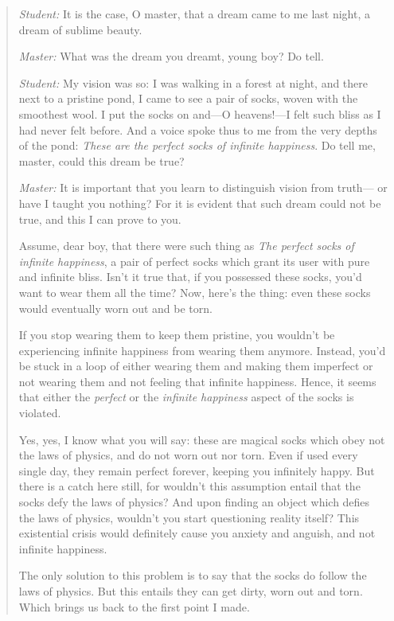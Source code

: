 \documentclass[a4paper, 12pt]{article}
\begin{document}
\begin{quote}

\textit{Student:} It is the case, O master, that a dream came to me last night,
a dream of sublime beauty. 

\textit{Master:} What was the dream you dreamt, young boy? Do tell.

\textit{Student:} My vision was so: I was walking in a forest at night, and there 
next to a pristine pond, I came to see a pair of socks, woven with the smoothest 
wool. I put the socks on and---O heavens!---I felt such bliss as I had never felt before.
And a voice spoke thus to me from the very depths of the pond: \textit{These
are the perfect socks of infinite happiness}. Do tell me, master, could this
dream be true?

\textit{Master:} It is important that you learn to distinguish vision from truth---
or have I taught you nothing? For it is evident that such dream could not be true,
and this I can prove to you.

Assume, dear boy, that there were such thing as \textit{The perfect socks of infinite happiness},
a pair of perfect socks which grant its user with pure and infinite bliss. Isn't it true that, 
if you possessed these socks, you'd want to wear them all the time? Now, here's the thing:
even these socks would eventually worn out and be torn. 

If you stop wearing them to keep them pristine, you wouldn't be experiencing
infinite happiness from wearing them anymore. Instead, you'd be stuck in a loop
of either wearing them and making them imperfect or not wearing them and not
feeling that infinite happiness. Hence, it seems that either the \textit{perfect} or 
the \textit{infinite happiness} aspect of the socks is violated.

Yes, yes, I know what you will say: these are magical socks which obey not the
laws of physics, and do not worn out nor torn. Even if used every single day, they 
remain perfect forever, keeping you infinitely happy. But there is a catch here still,
for wouldn't this assumption entail that the socks defy the laws of physics? And
upon finding an object which defies the laws of physics, wouldn't you start
questioning reality itself? This existential crisis would definitely cause you
anxiety and anguish, and not infinite happiness.

The only solution to this problem is to say that the socks do follow the laws
of physics. But this entails they can get dirty, worn out and torn. Which
brings us back to the first point I made.


\end{quote}
\end{document}

